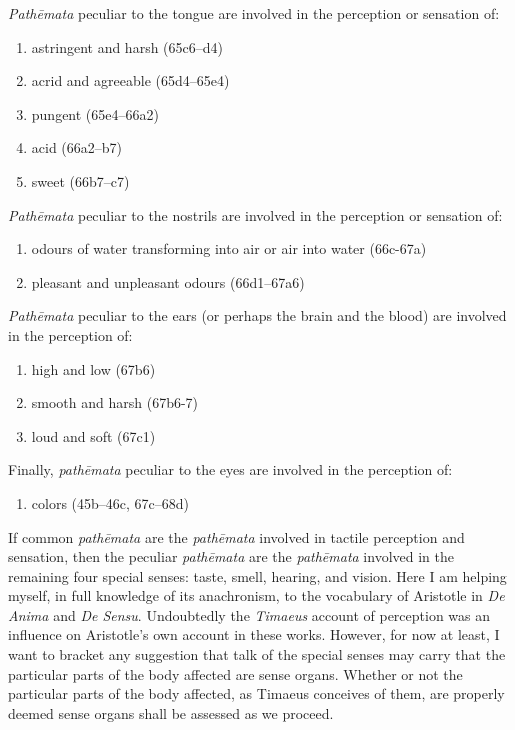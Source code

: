 \emph{Pathēmata} peculiar to the tongue are involved in the perception or sensation of:
\begin{enumerate}
	\item astringent and harsh (65c6--d4)
	\item acrid and agreeable (65d4--65e4)
	\item pungent (65e4--66a2)
	\item acid (66a2--b7)
	\item sweet (66b7--c7)
\end{enumerate}

\emph{Pathēmata} peculiar to the nostrils are involved in the perception or sensation of:
\begin{enumerate}
	\item odours of water transforming into air or air into water (66c-67a)
	\item pleasant and unpleasant odours (66d1--67a6)
\end{enumerate}

\emph{Pathēmata} peculiar to the ears (or perhaps the brain and the blood) are involved in the perception of:
\begin{enumerate}
	\item high and low (67b6)
	\item smooth and harsh (67b6-7)
	\item loud and soft (67c1)
\end{enumerate}

Finally, \emph{pathēmata} peculiar to the eyes are involved in the perception of:
\begin{enumerate}
	\item colors (45b--46c, 67c--68d)
\end{enumerate}

If common \emph{pathēmata} are the \emph{pathēmata} involved in tactile perception and sensation, then the peculiar \emph{pathēmata} are the \emph{pathēmata} involved in the remaining four special senses: taste, smell, hearing, and vision. Here I am helping myself, in full knowledge of its anachronism, to the vocabulary of Aristotle in \emph{De Anima} and \emph{De Sensu}. Undoubtedly the \emph{Timaeus} account of perception was an influence on Aristotle's own account in these works. However, for now at least, I want to bracket any suggestion that talk of the special senses may carry that the particular parts of the body affected are sense organs. Whether or not the particular parts of the body affected, as Timaeus conceives of them, are properly deemed sense organs shall be assessed as we proceed.

